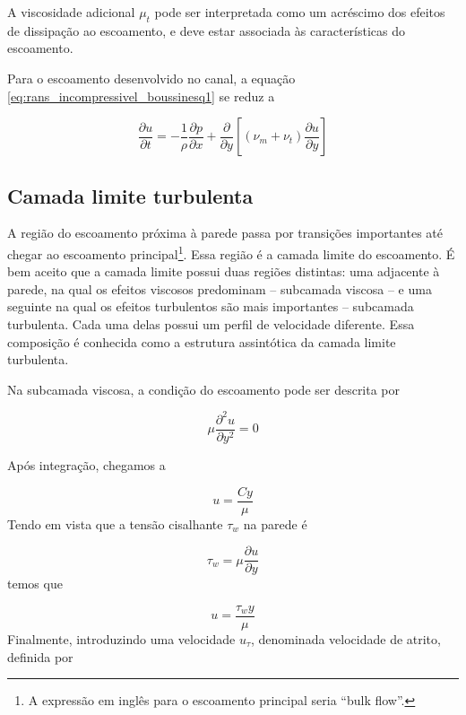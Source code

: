 \documentclass[a4paper,portuguese,10pt]{article}
\renewcommand{\D}{\partial}
\begin{document}
A viscosidade adicional $\mu_t$ pode ser interpretada como um acréscimo dos efeitos de dissipação ao escoamento, e deve estar associada às características do escoamento.

Para o escoamento desenvolvido no canal, a equação \ref{eq:rans_incompressivel_boussinesq1} se reduz a

\begin{equation}
  \frac{\D u}{\D t}=-\frac{1}{\rho}\frac{\D p}{\D x}+\frac{\D}{\D y}\left[(\nu_m+\nu_t)\frac{\D u}{\D y}\right]
  \label{eq:rans_incompressivel_boussinesq2}
\end{equation}

\subsection{Camada limite turbulenta}

A região do escoamento próxima à parede passa por transições importantes até chegar ao escoamento principal\footnote{A expressão em inglês para o escoamento principal seria ``bulk flow''.}. Essa região é a camada limite do escoamento. É bem aceito que a camada limite possui duas regiões distintas: uma adjacente à parede, na qual os efeitos viscosos predominam -- subcamada viscosa -- e uma seguinte na qual os efeitos turbulentos são mais importantes -- subcamada turbulenta. Cada uma delas possui um perfil de velocidade diferente. Essa composição é conhecida como a estrutura assintótica da camada limite turbulenta.

Na subcamada viscosa, a condição do escoamento pode ser descrita por

\begin{equation}
  \mu\frac{\D^2u}{\D y^2} = 0
\end{equation}

Após integração, chegamos a

\begin{equation}
  u = \frac{Cy}{\mu}
\end{equation}
Tendo em vista que a tensão cisalhante $\tau_w$ na parede é

\begin{equation}
  \tau_w = \mu\frac{\D u}{\D y}
\end{equation}
temos que

\begin{equation}
  u = \frac{\tau_wy}{\mu}
  \label{eq:subcamada_viscosa_dim}
\end{equation}
Finalmente, introduzindo uma velocidade $u_{\tau}$, denominada velocidade de atrito, definida por
\end{document}
